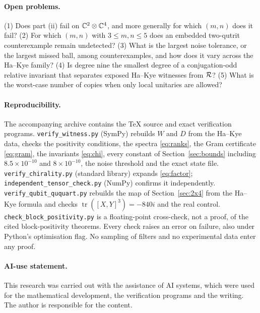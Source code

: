 \documentclass[11pt,a4paper]{article}
\theoremstyle{definition}\newtheorem{definition}[theorem]{Definition}\newtheorem*{conj}{Conjecture 9 of Shen, Chen and Bian}\newtheorem{remark}[theorem]{Remark}
\newcommand{\tr}{\operatorname{tr}}\newcommand{\im}{\operatorname{Im}}\newcommand{\adj}{\operatorname{adj}}\newcommand{\id}{\mathbb I}
\begin{document}
\paragraph{Open problems.}
(1) Does part (ii) fail on $\mathbb C^2\otimes\mathbb C^4$, and more generally for which $(m,n)$ does it fail? (2) For which $(m,n)$ with $3\leq m,n\leq5$ does an embedded two-qutrit counterexample remain undetected? (3) What is the largest noise tolerance, or the largest missed ball, among counterexamples, and how does it vary across the Ha--Kye family? (4) Is degree nine the smallest degree of a conjugation-odd relative invariant that separates exposed Ha--Kye witnesses from $\mathcal R$? (5) What is the worst-case number of copies when only local unitaries are allowed?

\paragraph{Reproducibility.}
The accompanying archive contains the \TeX{} source and exact verification programs. \texttt{verify\_witness.py} (SymPy) rebuilds $W$ and $D$ from the Ha--Kye data, checks the positivity conditions, the spectra \eqref{eq:ranks}, the Gram certificate \eqref{eq:gram}, the invariants \eqref{eq:chi}, every constant of Section~\ref{sec:bounds} including $8.5\times10^{-10}$ and $8\times10^{-10}$, the noise threshold and the exact state file. \texttt{verify\_chirality.py} (standard library) expands \eqref{eq:factor}; \texttt{independent\_tensor\_check.py} (NumPy) confirms it independently. \texttt{verify\_qubit\_ququart.py} rebuilds the map of Section~\ref{sec:2x4} from the Ha--Kye formula and checks $\tr([X,Y]^3)=-840i$ and the real control. \texttt{check\_block\_positivity.py} is a floating-point cross-check, not a proof, of the cited block-positivity theorems. Every check raises an error on failure, also under Python's optimisation flag. No sampling of filters and no experimental data enter any proof.

\paragraph{AI-use statement.} This research was carried out with the assistance of AI systems, which were used for the mathematical development, the verification programs and the writing. The author is responsible for the content.
\end{document}
